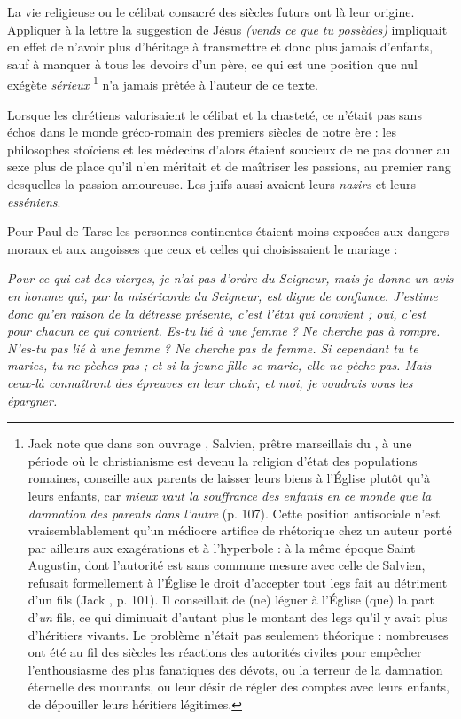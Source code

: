  La vie religieuse ou le célibat consacré des siècles futurs ont là leur origine. Appliquer à la lettre la suggestion de Jésus \emph{(vends ce que tu possèdes)} impliquait en effet de n'avoir plus d'héritage à transmettre et donc plus jamais d'enfants, sauf à manquer à tous les devoirs d'un père, ce qui est une position que nul exégète \emph{sérieux}%
\footnote{Jack  note que dans son ouvrage , Salvien, prêtre marseillais du , à une période où le christianisme est devenu la religion d'état des populations romaines, conseille aux parents de laisser leurs biens à l'Église plutôt qu'à leurs enfants, car \emph{mieux vaut la souffrance des enfants en ce monde que la damnation des parents dans l'autre} (p. 107). Cette position antisociale n'est vraisemblablement qu'un médiocre artifice de rhétorique chez un auteur porté par ailleurs aux exagérations et à l'hyperbole : à la même époque Saint Augustin, dont l'autorité est sans commune mesure avec celle de Salvien, refusait formellement à l'Église le droit d'accepter tout legs fait au détriment d'un fils (Jack , p. 101). Il conseillait de (ne) léguer à l'Église (que) la part d'\emph{un} fils, ce qui diminuait d'autant plus le montant des legs qu'il y avait plus d'héritiers vivants. Le problème n'était pas seulement théorique : nombreuses ont été au fil des siècles les réactions des autorités civiles pour empêcher l'enthousiasme des plus fanatiques des dévots, ou la terreur de la damnation éternelle des mourants, ou leur désir de régler des comptes avec leurs enfants, de dépouiller leurs héritiers légitimes.}
n'a jamais prêtée à l'auteur de ce texte. 

 Lorsque les chrétiens valorisaient le célibat et la chasteté, ce n'était pas sans échos dans le monde gréco-romain des premiers siècles de notre ère : les philosophes stoïciens et les médecins d'alors étaient soucieux de ne pas donner au sexe plus de place qu'il n'en méritait et de maîtriser les passions, au premier rang desquelles la passion amoureuse. Les juifs aussi avaient leurs \emph{nazirs} et leurs \emph{esséniens}. 

 Pour Paul de Tarse les personnes continentes étaient moins exposées aux dangers moraux et aux angoisses que ceux et celles qui choisissaient le mariage :

\begin{displayquote}[I~Cor~7,~25-28]
\emph{Pour ce qui est des vierges, je n'ai pas d'ordre du Seigneur, mais je donne un avis en homme qui, par la miséricorde du Seigneur, est digne de confiance. J'estime donc qu'en raison de la détresse présente, c'est l'état qui convient ; oui, c'est pour chacun ce qui convient. Es-tu lié à une femme ? Ne cherche pas à rompre. N'es-tu pas lié à une femme ? Ne cherche pas de femme. Si cependant tu te maries, tu ne pèches pas ; et si la jeune fille se marie, elle ne pèche pas. Mais ceux-là connaîtront des épreuves en leur chair, et moi, je voudrais vous les épargner.}
\end{displayquote}

